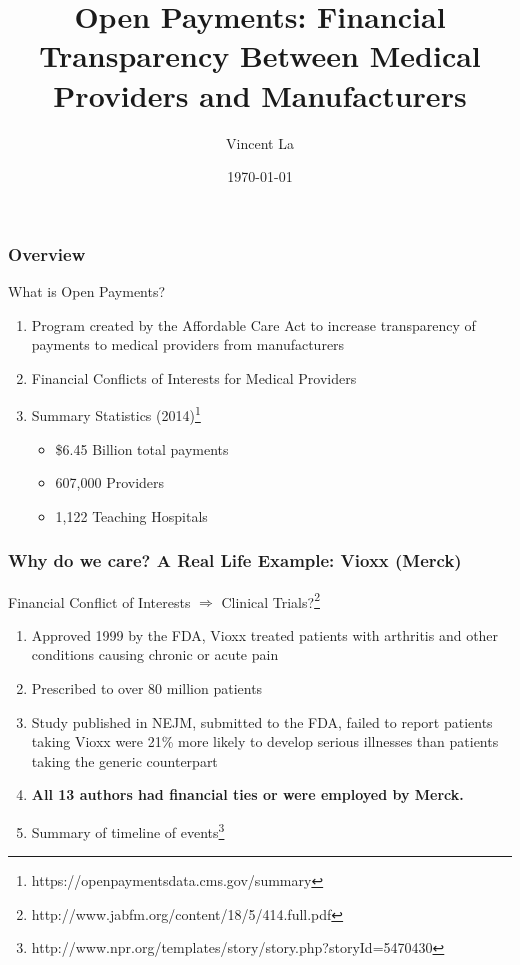 \documentclass{beamer}
\title{Open Payments: Financial Transparency Between Medical Providers and Manufacturers}
\author{Vincent La}
\institute{Code for San Francisco}
\date{\today}
\begin{document}
\maketitle

\begin{frame}
\label{Overview}
\frametitle{Overview}
What is Open Payments?
\begin{enumerate}
\item[1.] Program created by the Affordable Care Act to increase transparency of payments to medical providers from manufacturers
\newline
\item[2.] Financial Conflicts of Interests for Medical Providers
\newline
\item[3.] Summary Statistics (2014)\footnote{https://openpaymentsdata.cms.gov/summary}

\begin{itemize}
\item \$6.45 Billion total payments
\item 607,000 Providers
\item 1,122 Teaching Hospitals
\end{itemize}

\end{enumerate}
\end{frame}

\begin{frame} 
\frametitle{Why do we care? A Real Life Example: Vioxx (Merck)}
Financial Conflict of Interests $\Rightarrow$ Clinical Trials?\footnote{http://www.jabfm.org/content/18/5/414.full.pdf}
\begin{enumerate}
\item Approved 1999 by the FDA, Vioxx treated patients with arthritis and other conditions causing chronic or acute pain
\item Prescribed to over 80 million patients
\item Study published in NEJM, submitted to the FDA, failed to report patients taking Vioxx were 21\% more likely to develop serious illnesses than patients taking the generic counterpart
\item \textbf{All 13 authors had financial ties or were employed by Merck.}
\item Summary of timeline of events\footnote{http://www.npr.org/templates/story/story.php?storyId=5470430}
\end{enumerate}
\end{frame}
\end{document}
